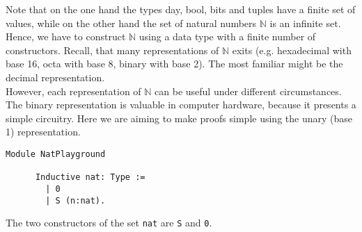 	  Note that on the one hand the types day, bool, bits and tuples have a finite set of values, while on the other hand the set of natural numbers $\mathbb{N}$ is an infinite set.\\ 
	  Hence, we have to construct $\mathbb{N}$ using a data type with a finite number of constructors. 
	  Recall, that many representations of $\mathbb{N}$ exits (e.g. hexadecimal with base 16, octa with base 8, binary with base 2).
	  The most familiar might be the decimal representation.\\
	  However, each representation of $\mathbb{N}$ can be useful under different circumstances. 
	  The binary representation is valuable in computer hardware, because it presents a simple circuitry.
	  Here we are aiming to make proofs simple using the unary (base 1) representation.
	  
	  \begin{lstlisting}[caption={\lstinline!nat!}, label=lst:DefNat]
	  Module NatPlayground
	  
	  Inductive nat: Type :=
	    | 0
	    | S (n:nat).
	  \end{lstlisting}  
	  The two constructors of the set \lstinline!nat! are \lstinline!S! and \lstinline!0!. \\
	
